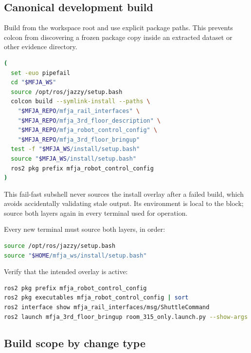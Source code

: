 \subsection{Canonical development build}

Build from the workspace root and use explicit package paths. This prevents
colcon from discovering a frozen package copy inside an extracted dataset or
other evidence directory.

\begin{lstlisting}[language=bash]
(
  set -euo pipefail
  cd "$MFJA_WS"
  source /opt/ros/jazzy/setup.bash
  colcon build --symlink-install --paths \
    "$MFJA_REPO/mfja_rail_interfaces" \
    "$MFJA_REPO/mfja_3rd_floor_description" \
    "$MFJA_REPO/mfja_robot_control_config" \
    "$MFJA_REPO/mfja_3rd_floor_bringup"
  test -f "$MFJA_WS/install/setup.bash"
  source "$MFJA_WS/install/setup.bash"
  ros2 pkg prefix mfja_robot_control_config
)
\end{lstlisting}

This fail-fast subshell never sources the install overlay after a failed build,
which avoids accidentally validating stale output. Its environment is local to
the block; source both layers again in every terminal used for operation.

Every new terminal must source both layers, in order:

\begin{lstlisting}[language=bash]
source /opt/ros/jazzy/setup.bash
source "$HOME/mfja_ws/install/setup.bash"
\end{lstlisting}

Verify that the intended overlay is active:

\begin{lstlisting}[language=bash]
ros2 pkg prefix mfja_robot_control_config
ros2 pkg executables mfja_robot_control_config | sort
ros2 interface show mfja_rail_interfaces/msg/ShuttleCommand
ros2 launch mfja_3rd_floor_bringup room_315_only.launch.py --show-args
\end{lstlisting}

\subsection{Build scope by change type}

